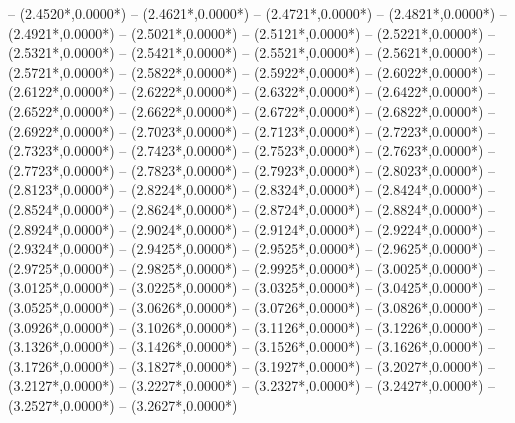 {	-- ({2.4520*\dx},{0.0000*\dy})
	-- ({2.4621*\dx},{0.0000*\dy})
	-- ({2.4721*\dx},{0.0000*\dy})
	-- ({2.4821*\dx},{0.0000*\dy})
	-- ({2.4921*\dx},{0.0000*\dy})
	-- ({2.5021*\dx},{0.0000*\dy})
	-- ({2.5121*\dx},{0.0000*\dy})
	-- ({2.5221*\dx},{0.0000*\dy})
	-- ({2.5321*\dx},{0.0000*\dy})
	-- ({2.5421*\dx},{0.0000*\dy})
	-- ({2.5521*\dx},{0.0000*\dy})
	-- ({2.5621*\dx},{0.0000*\dy})
	-- ({2.5721*\dx},{0.0000*\dy})
	-- ({2.5822*\dx},{0.0000*\dy})
	-- ({2.5922*\dx},{0.0000*\dy})
	-- ({2.6022*\dx},{0.0000*\dy})
	-- ({2.6122*\dx},{0.0000*\dy})
	-- ({2.6222*\dx},{0.0000*\dy})
	-- ({2.6322*\dx},{0.0000*\dy})
	-- ({2.6422*\dx},{0.0000*\dy})
	-- ({2.6522*\dx},{0.0000*\dy})
	-- ({2.6622*\dx},{0.0000*\dy})
	-- ({2.6722*\dx},{0.0000*\dy})
	-- ({2.6822*\dx},{0.0000*\dy})
	-- ({2.6922*\dx},{0.0000*\dy})
	-- ({2.7023*\dx},{0.0000*\dy})
	-- ({2.7123*\dx},{0.0000*\dy})
	-- ({2.7223*\dx},{0.0000*\dy})
	-- ({2.7323*\dx},{0.0000*\dy})
	-- ({2.7423*\dx},{0.0000*\dy})
	-- ({2.7523*\dx},{0.0000*\dy})
	-- ({2.7623*\dx},{0.0000*\dy})
	-- ({2.7723*\dx},{0.0000*\dy})
	-- ({2.7823*\dx},{0.0000*\dy})
	-- ({2.7923*\dx},{0.0000*\dy})
	-- ({2.8023*\dx},{0.0000*\dy})
	-- ({2.8123*\dx},{0.0000*\dy})
	-- ({2.8224*\dx},{0.0000*\dy})
	-- ({2.8324*\dx},{0.0000*\dy})
	-- ({2.8424*\dx},{0.0000*\dy})
	-- ({2.8524*\dx},{0.0000*\dy})
	-- ({2.8624*\dx},{0.0000*\dy})
	-- ({2.8724*\dx},{0.0000*\dy})
	-- ({2.8824*\dx},{0.0000*\dy})
	-- ({2.8924*\dx},{0.0000*\dy})
	-- ({2.9024*\dx},{0.0000*\dy})
	-- ({2.9124*\dx},{0.0000*\dy})
	-- ({2.9224*\dx},{0.0000*\dy})
	-- ({2.9324*\dx},{0.0000*\dy})
	-- ({2.9425*\dx},{0.0000*\dy})
	-- ({2.9525*\dx},{0.0000*\dy})
	-- ({2.9625*\dx},{0.0000*\dy})
	-- ({2.9725*\dx},{0.0000*\dy})
	-- ({2.9825*\dx},{0.0000*\dy})
	-- ({2.9925*\dx},{0.0000*\dy})
	-- ({3.0025*\dx},{0.0000*\dy})
	-- ({3.0125*\dx},{0.0000*\dy})
	-- ({3.0225*\dx},{0.0000*\dy})
	-- ({3.0325*\dx},{0.0000*\dy})
	-- ({3.0425*\dx},{0.0000*\dy})
	-- ({3.0525*\dx},{0.0000*\dy})
	-- ({3.0626*\dx},{0.0000*\dy})
	-- ({3.0726*\dx},{0.0000*\dy})
	-- ({3.0826*\dx},{0.0000*\dy})
	-- ({3.0926*\dx},{0.0000*\dy})
	-- ({3.1026*\dx},{0.0000*\dy})
	-- ({3.1126*\dx},{0.0000*\dy})
	-- ({3.1226*\dx},{0.0000*\dy})
	-- ({3.1326*\dx},{0.0000*\dy})
	-- ({3.1426*\dx},{0.0000*\dy})
	-- ({3.1526*\dx},{0.0000*\dy})
	-- ({3.1626*\dx},{0.0000*\dy})
	-- ({3.1726*\dx},{0.0000*\dy})
	-- ({3.1827*\dx},{0.0000*\dy})
	-- ({3.1927*\dx},{0.0000*\dy})
	-- ({3.2027*\dx},{0.0000*\dy})
	-- ({3.2127*\dx},{0.0000*\dy})
	-- ({3.2227*\dx},{0.0000*\dy})
	-- ({3.2327*\dx},{0.0000*\dy})
	-- ({3.2427*\dx},{0.0000*\dy})
	-- ({3.2527*\dx},{0.0000*\dy})
	-- ({3.2627*\dx},{0.0000*\dy})
}
